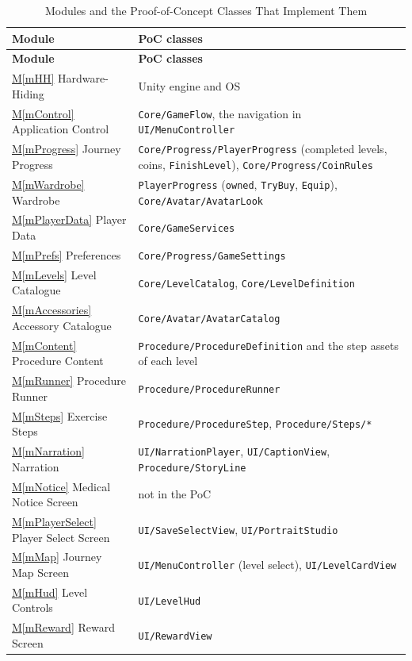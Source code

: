 \documentclass[12pt, titlepage]{article}
\newcommand{\mref}[1]{\hyperref[#1]{M\ref*{#1}}}
\begin{document}
\begin{longtable}{p{} p{}}
\caption{Modules and the Proof-of-Concept Classes That Implement Them}
\label{TblPoC}\\
\toprule
\textbf{Module} & \textbf{PoC classes}\\
\midrule
\endfirsthead
\toprule
\textbf{Module} & \textbf{PoC classes}\\
\midrule
\endhead
\mref{mHH} Hardware-Hiding & Unity engine and OS\\
\mref{mControl} Application Control & \texttt{Core/GameFlow}, the navigation in \texttt{UI/MenuController}\\
\mref{mProgress} Journey Progress & \texttt{Core/Progress/PlayerProgress} (completed levels, coins, \texttt{FinishLevel}), \texttt{Core/Progress/CoinRules}\\
\mref{mWardrobe} Wardrobe & \texttt{PlayerProgress} (\texttt{owned}, \texttt{TryBuy}, \texttt{Equip}), \texttt{Core/Avatar/AvatarLook}\\
\mref{mPlayerData} Player Data & \texttt{Core/GameServices}\\
\mref{mPrefs} Preferences & \texttt{Core/Progress/GameSettings}\\
\mref{mLevels} Level Catalogue & \texttt{Core/LevelCatalog}, \texttt{Core/LevelDefinition}\\
\mref{mAccessories} Accessory Catalogue & \texttt{Core/Avatar/AvatarCatalog}\\
\mref{mContent} Procedure Content & \texttt{Procedure/ProcedureDefinition} and the step assets of each level\\
\mref{mRunner} Procedure Runner & \texttt{Procedure/ProcedureRunner}\\
\mref{mSteps} Exercise Steps & \texttt{Procedure/ProcedureStep}, \texttt{Procedure/Steps/*}\\
\mref{mNarration} Narration & \texttt{UI/NarrationPlayer}, \texttt{UI/CaptionView}, \texttt{Procedure/StoryLine}\\
\mref{mNotice} Medical Notice Screen & not in the PoC\\
\mref{mPlayerSelect} Player Select Screen & \texttt{UI/SaveSelectView}, \texttt{UI/PortraitStudio}\\
\mref{mMap} Journey Map Screen & \texttt{UI/MenuController} (level select), \texttt{UI/LevelCardView}\\
\mref{mHud} Level Controls & \texttt{UI/LevelHud}\\
\mref{mReward} Reward Screen & \texttt{UI/RewardView}\\

\end{longtable}
\end{document}
